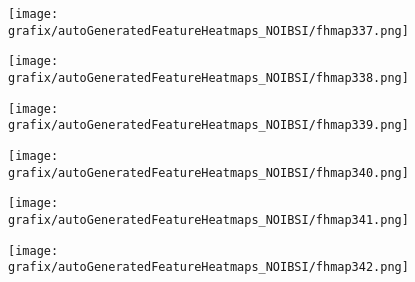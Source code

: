 \hspace{\hsp} 
\begin{subfigure}{\wid\textwidth} 
    \centering 
    \caption{\tiny \sffamily {}} 
    \vspace{\vsp} 
    \texttt{[image: grafix/autoGeneratedFeatureHeatmaps\_NOIBSI/fhmap337.png]} 
\end{subfigure} 
\hspace{\hsp} 
\begin{subfigure}{\wid\textwidth} 
    \centering 
    \caption{\tiny \sffamily {}} 
    \vspace{\vsp} 
    \texttt{[image: grafix/autoGeneratedFeatureHeatmaps\_NOIBSI/fhmap338.png]} 
\end{subfigure} 
\hspace{\hsp} 
\begin{subfigure}{\wid\textwidth} 
    \centering 
    \caption{\tiny \sffamily {}} 
    \vspace{\vsp} 
    \texttt{[image: grafix/autoGeneratedFeatureHeatmaps\_NOIBSI/fhmap339.png]} 
\end{subfigure} 
\hspace{\hsp} 
\begin{subfigure}{\wid\textwidth} 
    \centering 
    \caption{\tiny \sffamily {}} 
    \vspace{\vsp} 
    \texttt{[image: grafix/autoGeneratedFeatureHeatmaps\_NOIBSI/fhmap340.png]} 
\end{subfigure} 
\hspace{\hsp} 
\begin{subfigure}{\wid\textwidth} 
    \centering 
    \caption{\tiny \sffamily {}} 
    \vspace{\vsp} 
    \texttt{[image: grafix/autoGeneratedFeatureHeatmaps\_NOIBSI/fhmap341.png]} 
\end{subfigure} 
\hspace{\hsp} 
\begin{subfigure}{\wid\textwidth} 
    \centering 
    \caption{\tiny \sffamily {}} 
    \vspace{\vsp} 
    \texttt{[image: grafix/autoGeneratedFeatureHeatmaps\_NOIBSI/fhmap342.png]} 
\end{subfigure} 
\hspace{\hsp} 
